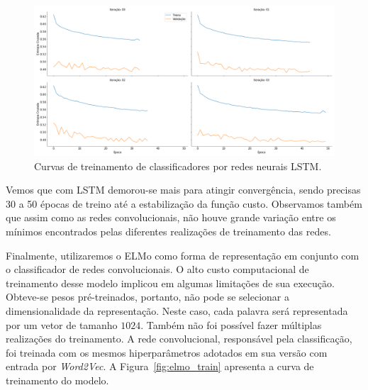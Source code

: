 \begin{figure}[h!]
\begin{center} {
    \begin{center}
    \includegraphics[scale=0.25]{images/lstm_train.png}
    \caption{Curvas de treinamento de classificadores por redes neurais LSTM.}
    \label{fig:lstm_train}
    \end{center}
}
\end{center}
\end{figure}

Vemos que com LSTM demorou-se mais para atingir convergência, sendo precisas
30 a 50 épocas de treino até a estabilização da função custo.
Observamos também que assim como as redes convolucionais, não houve grande
variação entre os mínimos encontrados pelas diferentes realizações de
treinamento das redes.

Finalmente, utilizaremos o ELMo como forma de representação em conjunto com o
classificador de redes convolucionais.
O alto custo computacional de treinamento desse modelo implicou em algumas
limitações de sua execução.
Obteve-se pesos pré-treinados, portanto, não pode se selecionar a
dimensionalidade da representação.
Neste caso, cada palavra será representada por um vetor de tamanho $1024$.
Também não foi possível fazer múltiplas realizações do treinamento.
A rede convolucional, responsável pela classificação, foi treinada com os mesmos
hiperparâmetros adotados em sua versão com entrada por \textit{Word2Vec}.
A Figura~\ref{fig:elmo_train} apresenta a curva de treinamento do modelo.


